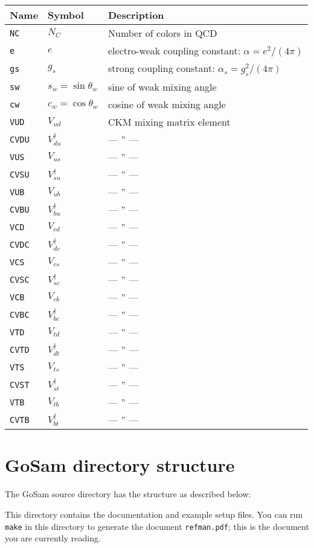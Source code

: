 \documentclass[11pt,a4paper]{refrep}
\newcommand{\gosamversion}{{3{.}0}}
\newcommand{\gosam}{{\sc GoSam}\xspace}
\newcommand{\gosamv}[1][\gosamversion]{{\sc GoSam}\xspace}
\begin{document}
\medskip
\begin{tabular}{|l|l|l|}
\hline
Name & Symbol & Description\\
\hline
\tt NC & $N_C$ & Number of colors in QCD\\
\tt e & $e$ & electro-weak coupling constant: $\alpha=e^2/(4\pi)$\\
\tt gs & $g_s$ & strong coupling constant: $\alpha_s=g_s^2/(4\pi)$\\
\tt sw & $s_w=\sin\theta_w$ & sine of weak mixing angle\\
\tt cw & $c_w=\cos\theta_w$ & cosine of weak mixing angle\\
\tt VUD & $V_{ud}$ & CKM mixing matrix element\\
\tt CVDU & $V_{du}^{\dagger}$ & --- '' ---\\
\tt VUS & $V_{us}$ & --- '' ---\\
\tt CVSU & $V_{su}^{\dagger}$ & --- '' ---\\
\tt VUB & $V_{ub}$ & --- '' ---\\
\tt CVBU & $V_{bu}^{\dagger}$ & --- '' ---\\
\tt VCD & $V_{cd}$ & --- '' ---\\
\tt CVDC & $V_{dc}^{\dagger}$ & --- '' ---\\
\tt VCS & $V_{cs}$ & --- '' ---\\
\tt CVSC & $V_{sc}^{\dagger}$ & --- '' ---\\
\tt VCB & $V_{cb}$ & --- '' ---\\
\tt CVBC & $V_{bc}^{\dagger}$ & --- '' ---\\
\tt VTD & $V_{td}$ & --- '' ---\\
\tt CVTD & $V_{dt}^{\dagger}$ & --- '' ---\\
\tt VTS & $V_{ts}$ & --- '' ---\\
\tt CVST & $V_{st}^{\dagger}$ & --- '' ---\\
\tt VTB & $V_{tb}$ & --- '' ---\\
\tt CVTB & $V_{bt}^{\dagger}$ & --- '' ---\\
\hline
\end{tabular}

\section{\gosam{} directory structure}
The \gosamv{} source directory has the structure as described below:

 This directory contains the documentation
and example setup files. You can run \texttt{make} in this directory
to generate the document \texttt{refman.pdf}; this is the document you
are currently reading.
\end{document}
